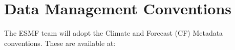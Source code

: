 
\section{Data Management Conventions}

The ESMF team will adopt the Climate and Forecast (CF) Metadata 
conventions.  These are available at:\newline
{}






